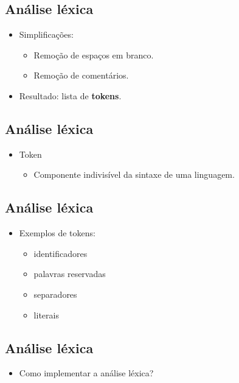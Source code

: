 \documentclass[11pt]{article}
\begin{document}
\subsection*{Análise léxica}
\label{sec:orge8faadc}

\begin{itemize}
\item Simplificações:
\begin{itemize}
\item Remoção de espaços em branco.
\item Remoção de comentários.
\end{itemize}

\item Resultado: lista de \textbf{\textbf{tokens}}.
\end{itemize}
\subsection*{Análise léxica}
\label{sec:org2277d79}

\begin{itemize}
\item Token
\begin{itemize}
\item Componente indivisível da sintaxe de uma linguagem.
\end{itemize}
\end{itemize}
\subsection*{Análise léxica}
\label{sec:orgecf268d}

\begin{itemize}
\item Exemplos de tokens:
\begin{itemize}
\item identificadores
\item palavras reservadas
\item separadores
\item literais
\end{itemize}
\end{itemize}
\subsection*{Análise léxica}
\label{sec:org31f8918}

\begin{itemize}
\item Como implementar a análise léxica?
\end{itemize}
\end{document}
